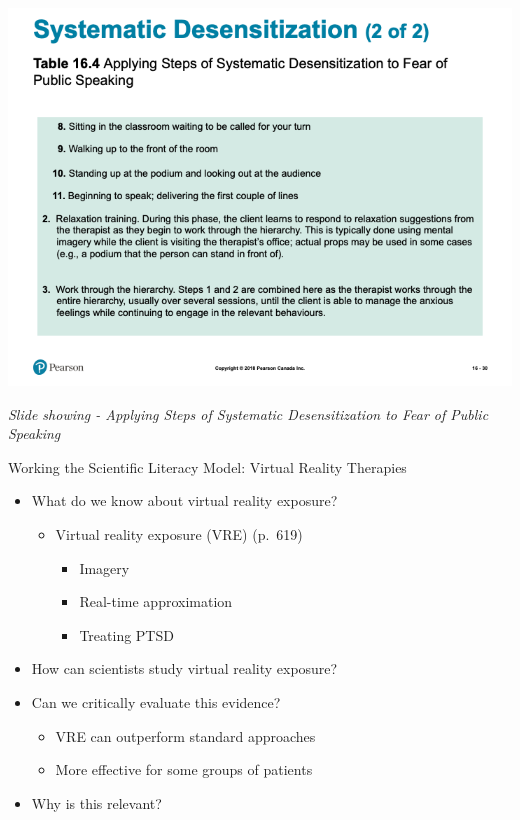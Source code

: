 \documentclass[
]{book}
\providecommand{\tightlist}{%
  \setlength{\itemsep}{0pt}\setlength{\parskip}{0pt}}
\begin{document}
\begin{reflect}
\includegraphics{assets/unit_11/slide_30.png}

\emph{Slide showing - Applying Steps of Systematic Desensitization to Fear of Public Speaking}

Working the Scientific Literacy Model: Virtual Reality Therapies

\begin{itemize}
\tightlist
\item
  What do we know about virtual reality exposure?

  \begin{itemize}
  \tightlist
  \item
    Virtual reality exposure (VRE) (p.~619)

    \begin{itemize}
    \tightlist
    \item
      Imagery\\
    \item
      Real-time approximation\\
    \item
      Treating PTSD\\
    \end{itemize}
  \end{itemize}
\item
  How can scientists study virtual reality exposure?\\
\item
  Can we critically evaluate this evidence?

  \begin{itemize}
  \tightlist
  \item
    VRE can outperform standard approaches\\
  \item
    More effective for some groups of patients\\
  \end{itemize}
\item
  Why is this relevant?


\end{itemize}
\end{reflect}
\end{document}
